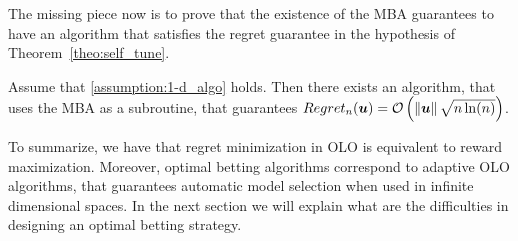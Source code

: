 The missing piece now is to prove that the existence of the \ac{MBA} guarantees to have an algorithm that satisfies the regret guarantee in the hypothesis of Theorem~\ref{theo:self_tune}.
\begin{theorem}
Assume that \ref{assumption:1-d_algo} holds.
Then there exists an algorithm, that uses the \ac{MBA} as a subroutine, that guarantees $Regret_n(\boldsymbol{u})=\mathcal{O}\left(\left\|{\boldsymbol{u}}\right\|\sqrt{n \ln(n)}\right)$.
\end{theorem}



To summarize, we have that regret minimization in OLO is equivalent to reward maximization. Moreover, optimal betting algorithms correspond to adaptive OLO algorithms, that guarantees automatic model selection when used in infinite dimensional spaces. In the next section we will explain what are the difficulties in designing an optimal betting strategy.